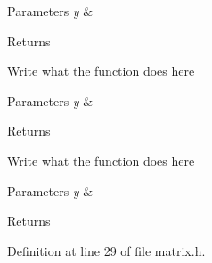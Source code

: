 \begin{DoxyParams}{Parameters}
{\em y} & \\
\hline
\end{DoxyParams}
\begin{DoxyReturn}{Returns}

\end{DoxyReturn}
Write what the function does here


\begin{DoxyParams}{Parameters}
{\em y} & \\
\hline
\end{DoxyParams}
\begin{DoxyReturn}{Returns}

\end{DoxyReturn}
Write what the function does here


\begin{DoxyParams}{Parameters}
{\em y} & \\
\hline
\end{DoxyParams}
\begin{DoxyReturn}{Returns}

\end{DoxyReturn}


Definition at line 29 of file matrix.\+h.


